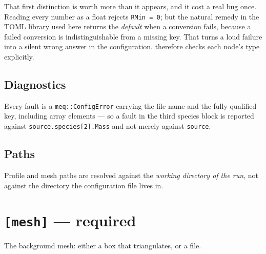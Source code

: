 That first distinction is worth more than it appears, and it cost a real bug
once. Reading every number as a float rejects \texttt{RMin = 0}; but the natural
remedy in the TOML library used here returns the \emph{default} when a
conversion fails, because a failed conversion is indistinguishable from a missing
key. That turns a loud failure into a silent wrong answer in the configuration.
{\meq} therefore checks each node's type explicitly.

\subsection{Diagnostics}

Every fault is a \texttt{meq::ConfigError} carrying the file name and the fully
qualified key, including array elements --- so a fault in the third species
block is reported against \texttt{source.species[2].Mass} and not merely against
\texttt{source}.

\subsection{Paths}

Profile and mesh paths are resolved against the \emph{working directory of the
run}, not against the directory the configuration file lives in.

\section{\texttt{[mesh]} --- required}

The background mesh: either a box that {\meq} triangulates, or a file.

